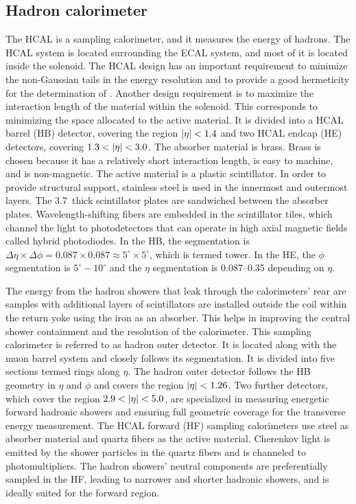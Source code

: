 \subsection{Hadron calorimeter}

The HCAL is a sampling calorimeter, and it measures the energy of hadrons. The HCAL system is located surrounding the ECAL system, and most of it is located inside the solenoid. The HCAL design has an important requirement to minimize the non-Gaussian tails in the energy resolution and to provide a good hermeticity for the determination of \met. Another design requirement is to maximize the interaction length of the material within the solenoid. This corresponds to minimizing the space allocated to the active material. It is divided into a HCAL barrel (HB) detector, covering the region $\lvert\eta\rvert < 1.4$ and two HCAL endcap (HE) detectors, covering $1.3 < \lvert\eta\rvert < 3.0$. The absorber material is brass. Brass is chosen because it has a relatively short interaction length, is easy to machine, and is non-magnetic. The active material is a plastic scintillator. In order to provide structural support, stainless steel is used in the innermost and outermost layers. The 3.7~\mm thick scintillator plates are sandwiched between the absorber plates. Wavelength-shifting fibers are embedded in the scintillator tiles, which channel the light to photodetectors that can operate in high axial magnetic fields called hybrid photodiodes. In the HB, the segmentation is $\Delta \eta \times \Delta \phi = 0.087 \times 0.087 \approx 5^{\circ} \times 5^{\circ}$, which is termed tower. In the HE, the $\phi$ segmentation is $5^\circ - 10^\circ$ and the $\eta$ segmentation is 0.087--0.35 depending on $\eta$.

The energy from the hadron showers that leak through the calorimeters' rear are samples with additional layers of scintillators are installed outside the coil within the return yoke using the iron as an absorber. This helps in improving the central shower containment and the \met resolution of the calorimeter. This sampling calorimeter is referred to as hadron outer detector. It is located along with the muon barrel system and closely follows its segmentation. It is divided into five sections termed rings along $\eta$. The hadron outer detector follows the HB geometry in $\eta$ and $\phi$ and covers the region $\lvert\eta\rvert < 1.26$. Two further detectors, which cover the region $2.9 < \lvert\eta\rvert < 5.0$, are specialized in measuring energetic forward hadronic showers and ensuring full geometric coverage for the transverse energy measurement. The HCAL forward (HF) sampling calorimeters use steel as absorber material and quartz fibers as the active material. Cherenkov light is emitted by the shower particles in the quartz fibers and is channeled to photomultipliers. The hadron showers' neutral components are preferentially sampled in the HF, leading to narrower and shorter hadronic showers, and is ideally suited for the forward region.

